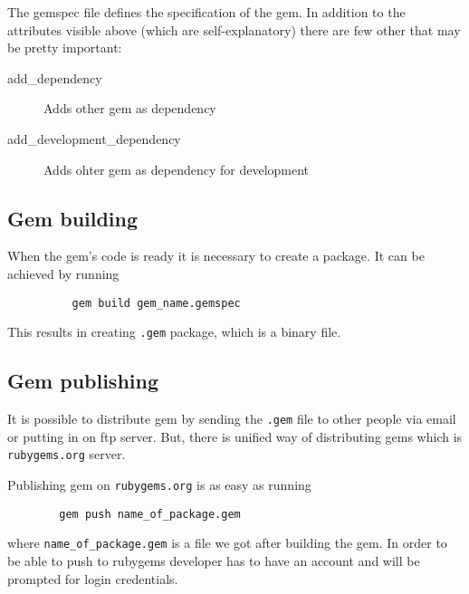       
      
      The gemspec file defines the specification of the gem. In addition to the attributes visible
      above (which are self-explanatory) there are few other that may be pretty important:
      \begin{description} 
        \item[add\_dependency] Adds other gem as dependency
        \item[add\_development\_dependency] Adds ohter gem as dependency for development
      \end{description}
      
    \subsection{Gem building}
      When the gem's code is ready it is necessary to create a package. It can be achieved by running 
      
       \begin{lstlisting}
          gem build gem_name.gemspec
        \end{lstlisting}
        
      This results in creating \texttt{.gem} package, which is a binary file.

    \subsection{Gem publishing}
      It is possible to distribute gem by sending the \texttt{.gem} file to other people via email or 
      putting in on ftp server. But, there is unified way of distributing gems which is 
      \texttt{rubygems.org} server. 
      
      Publishing gem on \texttt{rubygems.org} is as easy as running
      
      \begin{lstlisting}
        gem push name_of_package.gem
       \end{lstlisting}
       
      where \texttt{name\_of\_package.gem} is a file we got after building the gem. In order to be able to
      push to rubygems developer has to have an account and will be prompted for login credentials.
